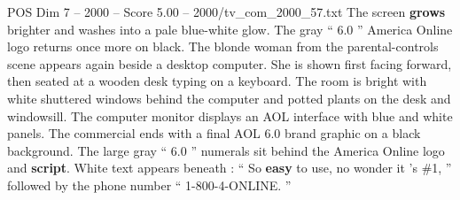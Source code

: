\begin{textsample}{POS Dim 7 – 2000 – Score 5.00 – 2000/tv\_com\_2000\_57.txt}
The screen \textbf{grows} brighter and washes into a pale blue-white glow.
The gray “ 6.0 ” America Online logo returns once more on black.
The blonde woman from the parental-controls scene appears again beside a desktop computer.
She is shown first facing forward, then seated at a wooden desk typing on a keyboard.
The room is bright with white shuttered windows behind the computer and potted plants on the desk and windowsill.
The computer monitor displays an AOL interface with blue and white panels.
The commercial ends with a final AOL 6.0 brand graphic on a black background.
The large gray “ 6.0 ” numerals sit behind the America Online logo and \textbf{script}.
White text appears beneath : “ So \textbf{easy} to use, no wonder it ’s \#1, ” followed by the phone number “ 1-800-4-ONLINE. ”

\end{textsample}

